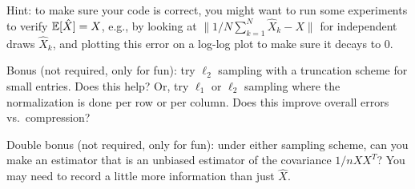 \documentclass[10pt, letterpaper]{scrartcl}
\begin{document}
\begin{enumerate}[align=left, leftmargin=*, label=\sffamily\bfseries Problem \arabic*:]
        Hint: to make sure your code is correct, you might want to run some experiments to verify $\operatorname{\mathbb{E}}[ \hat{X} ] = X$, e.g., by looking at $\| 1/N\sum_{k=1}^N \hat{X}_k - X\|$ for independent draws $\hat{X}_k$, and plotting this error on a log-log plot to make sure it decays to $0$.
        
        Bonus (not required, only for fun): try $\ell_2$ sampling with a truncation scheme for small entries. Does this help?  Or, try $\ell_1$ or $\ell_2$ sampling where the normalization is done per row or per column. Does this improve overall errors vs.\ compression?
        
        Double bonus (not required, only for fun): under either sampling scheme, can you make an estimator that is an unbiased estimator of the covariance $1/nXX^T$? You may need to record a little more information than just $\hat{X}$.
        
    
    
    

\end{enumerate}   
\end{document}
